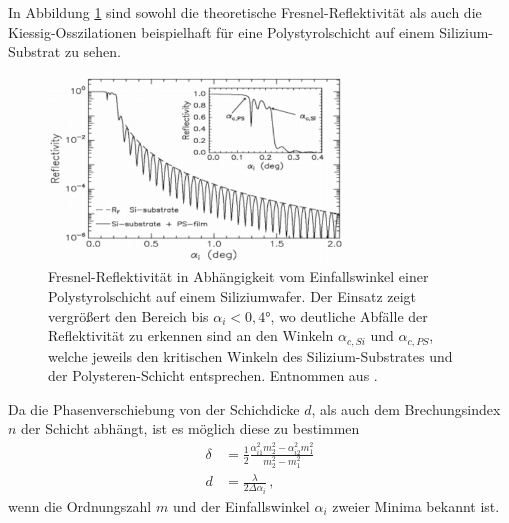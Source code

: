         In Abbildung \ref{fig:Oszi} sind sowohl die theoretische Fresnel-Reflektivität als auch die Kiessig-Osszilationen
        beispielhaft für eine Polystyrolschicht auf einem Silizium-Substrat zu sehen.
        \begin{figure}[h]
            \centering
            \includegraphics[width = 0.7\textwidth]{pictures/Oszi.png}
            \caption{Fresnel-Reflektivität in Abhängigkeit vom Einfallswinkel einer Polystyrolschicht auf einem Siliziumwafer.
                        Der Einsatz zeigt vergrößert den Bereich bis $\alpha_i<0,4°$,
                        wo deutliche Abfälle der Reflektivität zu erkennen sind
                        an den Winkeln $\alpha_{c,Si}$ und $\alpha_{c,PS}$,
                        welche jeweils den kritischen Winkeln des Silizium-Substrates
                        und der Polysteren-Schicht entsprechen. Entnommen aus \cite{tolan_x-ray_1999}.}
            \label{fig:Oszi}
        \end{figure}
        Da die Phasenverschiebung von der Schichdicke $d$, als auch dem Brechungsindex $n$ der Schicht abhängt,
        ist es möglich diese zu bestimmen
        \begin{align}
            \delta&=\frac{1}{2}\frac{\alpha_{i1}^2m_2^2-\alpha_{i2}^2m_1^2}{m_2^2-m_1^2} \\
            d&=\frac{\lambda}{2\Delta\alpha_i} \, , 
            \label{eqn:d_alpha}
        \end{align}
        wenn die Ordnungszahl $m$ und der Einfallswinkel $\alpha_i$ zweier Minima bekannt ist.

